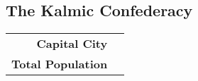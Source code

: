 \subsection{The Kalmic Confederacy}
\begin{tabular}{r | l}
    \textbf{Capital City} & \\
    \textbf{Total Population} & 
\end{tabular}
